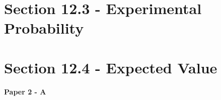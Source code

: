 \documentclass[12pt, a4paper]{article}
\begin{document}
\section*{Section 12.3 - Experimental Probability}\label{section:3-12-3}





\section*{Section 12.4 - Expected Value}\label{section:3-12-4}

\textbf{Paper 2 - A}
\begin{enumx}[label=\arabic*.,start=26]
\item {}\label{DSE2015-CoreP2-Q27} 
\item {}\label{DSE2016-CoreP2-Q29} 
\end{enumx}
\end{document}

